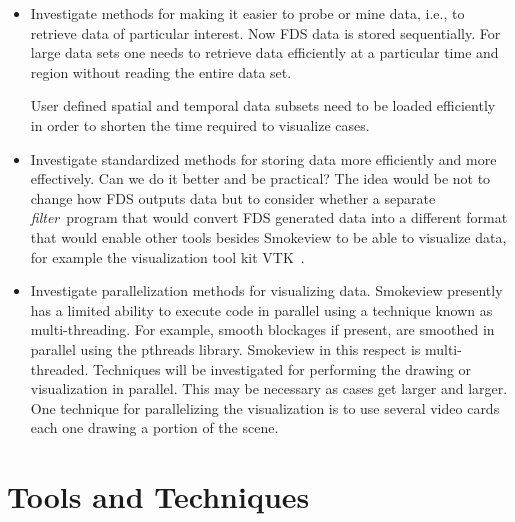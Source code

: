\documentclass[11pt,twoside]{book}
\begin{document}
\begin{itemize}
\item Investigate methods for making it easier to probe or mine
data, i.e., to retrieve data of particular interest.  Now
FDS data is stored sequentially.  For large data sets one needs to
retrieve data efficiently at a particular time and region without
reading the entire data set.

User defined spatial and temporal data subsets need to be loaded
efficiently in order to shorten the time required to visualize
cases.

\item Investigate standardized methods for storing data more
efficiently and more effectively.  Can we do it better and be
practical?  The idea would be not to change how FDS outputs data
but to consider whether a separate {\em filter}\ program that
would convert FDS generated data into a different format that
would enable other tools besides Smokeview to be able to visualize
data, for example the visualization tool kit VTK~\cite{VTK}.

\item Investigate parallelization methods for visualizing data.
Smokeview presently has a limited ability to execute code in
parallel using a technique known as multi-threading.    For
example, smooth blockages if present, are smoothed in parallel
using the pthreads library. Smokeview in this respect is
multi-threaded.  Techniques will be investigated for performing
the drawing or visualization in parallel.  This may be necessary
as cases get larger and larger.  One technique for parallelizing
the visualization is to use several video cards each one drawing a
portion of the scene.
\end{itemize}

%
%

\section{Tools and Techniques}
\end{document}
